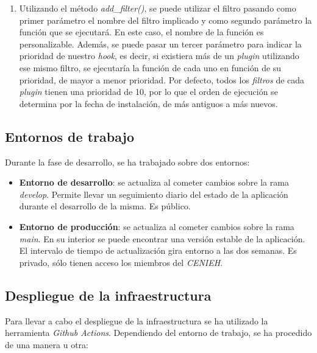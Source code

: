 
\begin{enumerate}
\def\labelenumi{\arabic{enumi}.}
\setcounter{enumi}{1}
\tightlist
\item
  Utilizando el método \emph{add\_filter()}, se puede utilizar el filtro
  pasando como primer parámetro el nombre del filtro implicado y como
  segundo parámetro la función que se ejecutará. En este caso, el nombre
  de la función es personalizable. Además, se puede pasar un tercer
  parámetro para indicar la prioridad de nuestro \emph{hook}, es decir,
  si existiera más de un \emph{plugin} utilizando ese mismo filtro, se
  ejecutaría la función de cada uno en función de su prioridad, de mayor
  a menor prioridad. Por defecto, todos los \emph{filtros} de cada
  \emph{plugin} tienen una prioridad de 10, por lo que el orden de
  ejecución se determina por la fecha de instalación, de más antiguos a
  más nuevos.
\end{enumerate}


\subsection{Entornos de trabajo}

Durante la fase de desarrollo, se ha trabajado sobre dos entornos:

\begin{itemize}
\tightlist
\item
  \textbf{Entorno de desarrollo}: se actualiza al cometer cambios sobre
  la rama \emph{develop}. Permite llevar un seguimiento diario del
  estado de la aplicación durante el desarrollo de la misma. Es público.
\item
  \textbf{Entorno de producción}: se actualiza al cometer cambios sobre
  la rama \emph{main}. En su interior se puede encontrar una versión
  estable de la aplicación. El intervalo de tiempo de actualización gira
  entorno a las dos semanas. Es privado, sólo tienen acceso los miembros
  del \emph{CENIEH}.
\end{itemize}


\subsection{Despliegue de la infraestructura}

Para llevar a cabo el despliegue de la infraestructura se ha utilizado
la herramienta \emph{Github Actions}. Dependiendo del entorno de
trabajo, se ha procedido de una manera u otra:


